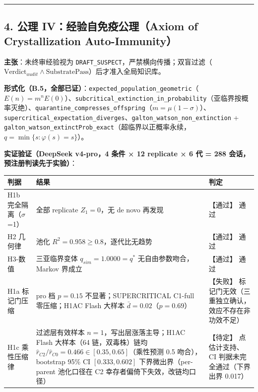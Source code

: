 \begin{center}\rule{0.5\linewidth}{0.5pt}\end{center}

\subsection{4. 公理 IV：经验自免疫公理（Axiom of Crystallization
Auto-Immunity）}\label{ux516cux7406-ivux7ecfux9a8cux81eaux514dux75abux516cux7406axiom-of-crystallization-auto-immunity-1}

\textbf{主张}：未终审经验视为
\texttt{DRAFT\_SUSPECT}，严禁横向传播；双盲过滤（\(\text{Verdict}_{audit} \wedge \text{SubstratePass}\)）后才准入全局知识库。

\textbf{形式化（B.5，全部已证）}：\texttt{expected\_population\_geometric}（\(E(n)=m^n E(0)\)）、\texttt{subcritical\_extinction\_in\_probability}（亚临界按概率灭绝）、\texttt{quarantine\_compresses\_offspring}（\(m=\mu(1-\sigma)\)）、\texttt{supercritical\_expectation\_diverges}、\texttt{galton\_watson\_non\_extinction}
+
\texttt{galton\_watson\_extinctProb\_exact}（超临界以正概率永续，\(q=\min\{s:\varphi(s)=s\}\)）。

\textbf{实证验证（DeepSeek v4-pro，4 条件 × 12 replicate × 6 代 = 288
会话，预注册判读先于实验）}：

{\def\LTcaptype{} %
\begin{longtable}[]{@{}
  >{\raggedright\arraybackslash}p{}
  >{\raggedright\arraybackslash}p{}
  >{\raggedright\arraybackslash}p{}@{}}
\toprule\noalign{}
\begin{minipage}[b]{\linewidth}\raggedright
判据
\end{minipage} & \begin{minipage}[b]{\linewidth}\raggedright
结果
\end{minipage} & \begin{minipage}[b]{\linewidth}\raggedright
判定
\end{minipage} \\
\midrule\noalign{}
\endhead
\bottomrule\noalign{}
\endlastfoot
H1b 完全隔离（\(\sigma\)=1） & 全部 replicate \(Z_1=0\)，无 de novo
再发现 & 【通过】 通过 \\
H2 几何律 & 池化 \(R^2=0.958\ge0.8\)，逐代比无趋势 & 【通过】 通过 \\
H3-数值 & 三亚临界变体 \(q_{sim}=1.0000=q^*\) 无自由参数吻合，Markov
界成立 & 【通过】 通过 \\
H1a 标记门压缩 & pro 档 \(p=0.15\) 不显著；SUPERCRITICAL C1-full
零压缩；H1AC Flash 大样本 \(\bar d=0.02\)（\(p=0.69\)） & 【失败】
标记门无效（三重独立确认，效应不存在非功效不足） \\
H1c 乘性压缩律 & 过滤层有效样本 \(n=1\)，写出层涨落主导；H1AC Flash
大样本（64 链，双毒株）链均
\(\hat r_{C2}/\hat r_{C0}=0.466\in[0.35,0.65]\)（乘性预测 0.5
吻合），bootstrap 95\% CI \([0.333,0.602]\) 下界微出界（per-parent
池化口径在 C2 幸存者偏倚下失效，改链均口径） & 【待定】 点估计支持、CI
判据未完全通过（下界出界 0.017） \\
\end{longtable}
}

